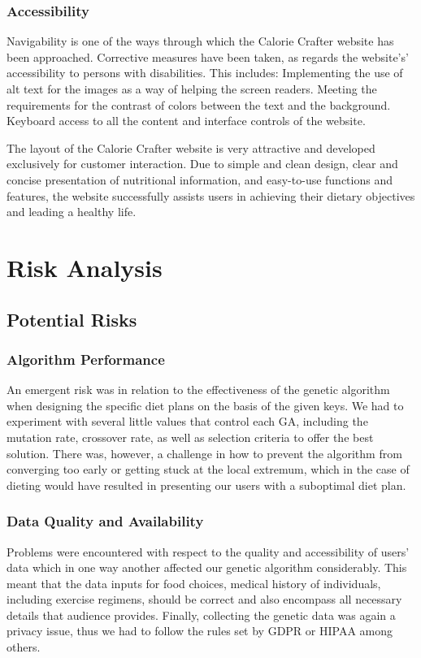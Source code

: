 \documentclass[a4paper,12pt]{article}
\begin{document}
\subsubsection{Accessibility}
Navigability is one of the ways through which the Calorie Crafter website has been approached. Corrective measures have been taken, as regards the website’s’ accessibility to persons with disabilities. This includes:
Implementing the use of alt text for the images as a way of helping the screen readers.
Meeting the requirements for the contrast of colors between the text and the background.
Keyboard access to all the content and interface controls of the website.

The layout of the Calorie Crafter website is very attractive and developed exclusively for customer interaction. Due to simple and clean design, clear and concise presentation of nutritional information, and easy-to-use functions and features, the website successfully assists users in achieving their dietary objectives and leading a healthy life.




\section{Risk Analysis}
\subsection{Potential Risks}
\subsubsection{Algorithm Performance}
An emergent risk was in relation to the effectiveness of the genetic algorithm when designing the specific diet plans on the basis of the given keys. We had to experiment with several little values that control each GA, including the mutation rate, crossover rate, as well as selection criteria to offer the best solution. There was, however, a challenge in how to prevent the algorithm from converging too early or getting stuck at the local extremum, which in the case of dieting would have resulted in presenting our users with a suboptimal diet plan.

\subsubsection{Data Quality and Availability}
 Problems were encountered with respect to the quality and accessibility of users’ data which in one way  another affected our genetic algorithm considerably. This meant that the data inputs for food choices, medical history of individuals, including exercise regimens, should be correct and also encompass all necessary details that audience provides. Finally, collecting the genetic data was again a privacy issue, thus we had to follow the rules set by GDPR or HIPAA among others.
\end{document}
